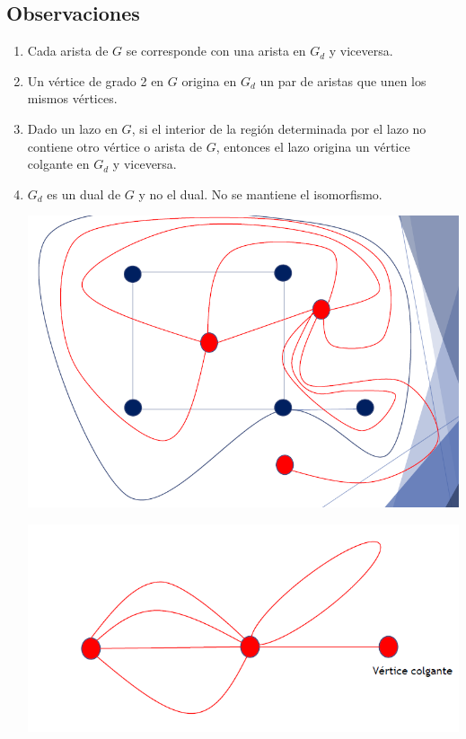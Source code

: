 \documentclass{article}
\begin{document}
\subsection{Observaciones}
\begin{enumerate}
    \item Cada arista de $G$ se corresponde con una arista en $G_d$ y viceversa.
    \item Un vértice de grado 2 en $G$ origina en $G_d$ un par de aristas que unen los mismos vértices.
    \item Dado un lazo en $G$, si el interior de la región determinada por el lazo no
    contiene otro vértice o arista de $G$, entonces el lazo origina un vértice colgante en $G_d$ y viceversa.
    \item $G_d$ es un dual de $G$ y no el dual. No se mantiene el isomorfismo.
    \\\begin{minipage}{.45 \textwidth}
        \includegraphics[width=\textwidth]{grafoDual1.PNG}
    \end{minipage}
    \begin{minipage}{.45 \textwidth}
        \includegraphics[width=\textwidth]{grafoDualB.PNG}

\end{minipage}
\end{enumerate}
\end{document}
